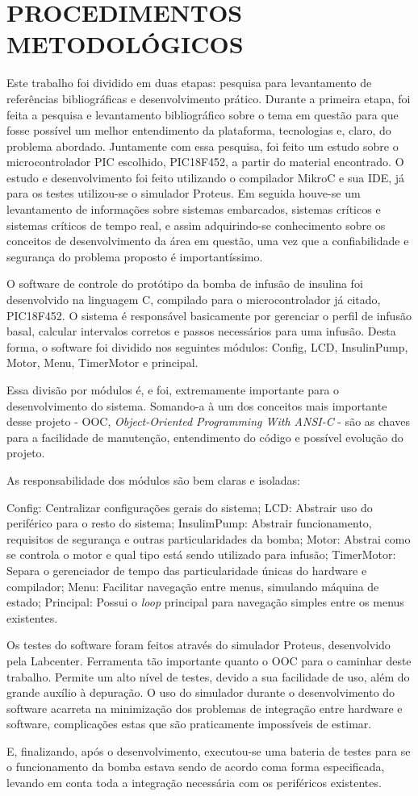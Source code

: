 \section{PROCEDIMENTOS METODOLÓGICOS}
Este trabalho foi dividido em duas etapas: pesquisa para levantamento de referências bibliográficas e desenvolvimento prático. Durante a primeira etapa, foi feita a pesquisa e levantamento bibliográfico sobre o tema em questão para que fosse possível um melhor entendimento da plataforma, tecnologias e, claro, do problema abordado. Juntamente com essa pesquisa, foi feito um estudo sobre o microcontrolador PIC escolhido, PIC18F452, a partir do material encontrado. O estudo e desenvolvimento foi feito utilizando o compilador MikroC e sua IDE, já para os testes utilizou-se o simulador Proteus. Em seguida houve-se um levantamento de informações sobre sistemas embarcados, sistemas críticos e sistemas críticos de tempo real, e assim adquirindo-se conhecimento sobre os conceitos de desenvolvimento da área em questão, uma vez que a confiabilidade e segurança do problema proposto é importantíssimo.


O software de controle do protótipo da bomba de infusão de insulina foi desenvolvido na linguagem C, compilado para o microcontrolador já citado, PIC18F452. O sistema é responsável basicamente por gerenciar o perfil de infusão basal, calcular intervalos corretos e passos necessários para uma infusão. Desta forma, o
software foi dividido nos seguintes módulos: Config, LCD, InsulinPump, Motor, Menu, TimerMotor e principal. 

Essa divisão por módulos é, e foi, extremamente importante para o desenvolvimento do sistema. Somando-a à um dos conceitos mais importante desse projeto - OOC, \emph{Object-Oriented Programming With ANSI-C} - são as chaves para a facilidade de manutenção, entendimento do código e possível evolução do projeto.

As responsabilidade dos módulos são bem claras e isoladas:

Config: Centralizar configurações gerais do sistema;
LCD: Abstrair uso do periférico para o resto do sistema;
InsulimPump: Abstrair funcionamento, requisitos de segurança e outras particularidades da bomba;
Motor: Abstrai como se controla o motor e qual tipo está sendo utilizado para infusão;
TimerMotor: Separa o gerenciador de tempo das particularidade únicas do hardware e compilador;
Menu: Facilitar navegação entre menus, simulando máquina de estado;
Principal: Possui o \emph{loop} principal para navegação simples entre os menus existentes.

Os testes do software foram feitos através do simulador Proteus, desenvolvido pela Labcenter. Ferramenta tão importante quanto o OOC para o caminhar deste trabalho. Permite um alto nível de testes, devido a sua facilidade de uso, além do grande auxílio à depuração. O uso do simulador durante o desenvolvimento do software acarreta na minimização dos problemas de integração entre hardware e software, complicações estas que são praticamente impossíveis de estimar. 

E, finalizando, após o desenvolvimento, executou-se uma bateria de testes para se o funcionamento da bomba estava sendo de acordo coma forma especificada, levando em conta toda a integração necessária com os periféricos existentes.
